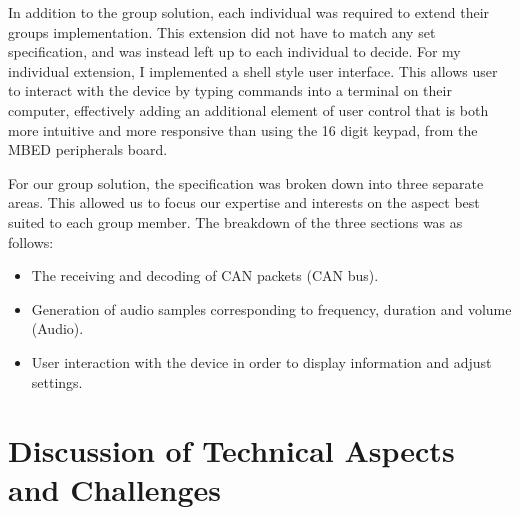 \noindent
In addition to the group solution, each individual was required to extend their 
groups implementation.  
This extension did not have to match any set specification, and was instead left 
up to each individual to decide.
For my individual extension, I implemented a shell style user interface. 
This allows user to interact with the device by typing commands into a terminal 
on their computer, effectively adding an additional element of user control that 
is both more intuitive and more responsive than using the 16 digit keypad, from 
the MBED peripherals board.
\par\bigskip\noindent
For our group solution, the specification was broken down into three separate 
areas. 
This allowed us to focus our expertise and interests on the aspect best 
suited to each group member.
The breakdown of the three sections was as follows: 
\begin{itemize}
    \item 
        The receiving and decoding of CAN packets (CAN bus).
    \item 
        Generation of audio samples corresponding to frequency, duration and 
        volume (Audio).
    \item 
        User interaction with the device in order to display information 
        and adjust settings.
\end{itemize}



\section{Discussion of Technical Aspects and Challenges}

